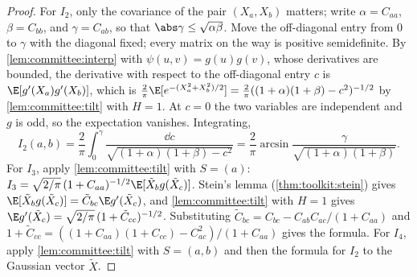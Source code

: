 \begin{refsection}

\begin{proof}
For $I_2$, only the covariance of the pair $(X_a,X_b)$ matters; write $\alpha=C_{aa}$, $\beta=C_{bb}$, and $\gamma=C_{ab}$, so that $\abs\gamma\le\sqrt{\alpha\beta}$. Move the off-diagonal entry from $0$ to $\gamma$ with the diagonal fixed; every matrix on the way is positive semidefinite. By \cref{lem:committee:interp} with $\psi(u,v)=g(u)g(v)$, whose derivatives are bounded, the derivative with respect to the off-diagonal entry $c$ is $\E[g'(X_a)g'(X_b)]$, which is $\frac2\pi\E[e^{-(X_a^2+X_b^2)/2}]=\frac2\pi((1+\alpha)(1+\beta)-c^2)^{-1/2}$ by \cref{lem:committee:tilt} with $H=1$. At $c=0$ the two variables are independent and $g$ is odd, so the expectation vanishes. Integrating,
\[
  I_2(a,b)=\frac2\pi\int_0^\gamma\frac{\dd c}{\sqrt{(1+\alpha)(1+\beta)-c^2}}=\frac2\pi\arcsin\frac{\gamma}{\sqrt{(1+\alpha)(1+\beta)}} .
\]
For $I_3$, apply \cref{lem:committee:tilt} with $S=(a)$: $I_3=\sqrt{2/\pi}\,(1+C_{aa})^{-1/2}\E[\tilde X_bg(\tilde X_c)]$. Stein's lemma (\cref{thm:toolkit:stein}) gives $\E[\tilde X_bg(\tilde X_c)]=\tilde C_{bc}\E g'(\tilde X_c)$, and \cref{lem:committee:tilt} with $H=1$ gives $\E g'(\tilde X_c)=\sqrt{2/\pi}\,(1+\tilde C_{cc})^{-1/2}$. Substituting $\tilde C_{bc}=C_{bc}-C_{ab}C_{ac}/(1+C_{aa})$ and $1+\tilde C_{cc}=((1+C_{aa})(1+C_{cc})-C_{ac}^2)/(1+C_{aa})$ gives the formula. For $I_4$, apply \cref{lem:committee:tilt} with $S=(a,b)$ and then the formula for $I_2$ to the Gaussian vector $\tilde X$.


\end{proof}
\end{refsection}

